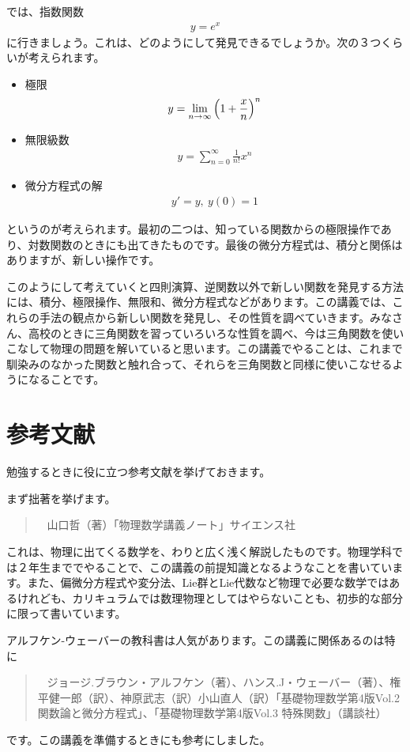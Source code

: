 \documentclass[report,paper=a4, fontsize=12pt, line_length=16cm, number_of_lines=33,dvipdfmx]{jlreq}
\newenvironment{mycite}{\begin{quote} \sffamily \textbullet\ }{\end{quote}}
\numberwithin{equation}{section}
\begin{document}
では、指数関数
\begin{align}
  y=e^x
\end{align}
に行きましょう。これは、どのようにして発見できるでしょうか。次の３つくらいが考えられます。
\begin{itemize}
  \item 極限
  \begin{align}
    y=\lim_{n\to \infty}\qty(1+\frac{x}{n})^n
  \end{align}
  \item 無限級数
  \begin{align}
    y=\sum_{n=0}^{\infty}\frac{1}{n!}x^n
  \end{align}
  \item 微分方程式の解
  \begin{align}
    y'=y,\ y(0)=1
  \end{align}
\end{itemize}
というのが考えられます。最初の二つは、知っている関数からの極限操作であり、対数関数のときにも出てきたものです。最後の微分方程式は、積分と関係はありますが、新しい操作です。

このようにして考えていくと四則演算、逆関数以外で新しい関数を発見する方法には、積分、極限操作、無限和、微分方程式などがあります。この講義では、これらの手法の観点から新しい関数を発見し、その性質を調べていきます。みなさん、高校のときに三角関数を習っていろいろな性質を調べ、今は三角関数を使いこなして物理の問題を解いていると思います。この講義でやることは、これまで馴染みのなかった関数と触れ合って、それらを三角関数と同様に使いこなせるようになることです。

\section{参考文献}

勉強するときに役に立つ参考文献を挙げておきます。

まず拙著を挙げます。
\begin{mycite}
  山口哲（著）「物理数学講義ノート」サイエンス社
\end{mycite}
これは、物理に出てくる数学を、わりと広く浅く解説したものです。物理学科では２年生まででやることで、この講義の前提知識となるようなことを書いています。また、偏微分方程式や変分法、Lie群とLie代数など物理で必要な数学ではあるけれども、カリキュラムでは数理物理としてはやらないことも、初歩的な部分に限って書いています。

アルフケン-ウェーバーの教科書は人気があります。この講義に関係あるのは特に
\begin{mycite}
  ジョージ.ブラウン・アルフケン（著）、ハンス.J・ウェーバー（著）、権平健一郎（訳）、神原武志（訳）小山直人（訳）「基礎物理数学第4版Vol.2 関数論と微分方程式」、「基礎物理数学第4版Vol.3 特殊関数」（講談社）
\end{mycite}
です。この講義を準備するときにも参考にしました。
\end{document}
